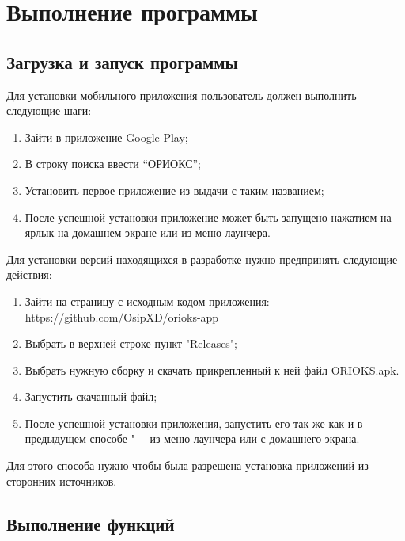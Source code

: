 \chapter{Выполнение программы}
\label{ch:execution}

\section{Загрузка и запуск программы}
\label{sec:running}
Для установки мобильного приложения пользователь должен выполнить следующие шаги:
\begin{enumerate}
  \item Зайти в приложение Google Play;
  \item В строку поиска ввести ``ОРИОКС'';
  \item Установить первое приложение из выдачи с таким названием;
  \item После успешной установки приложение может быть запущено нажатием на ярлык на домашнем экране или из меню лаунчера.
\end{enumerate}

Для установки версий находящихся в разработке нужно предпринять следующие действия:
\begin{enumerate}
  \item Зайти на страницу с исходным кодом приложения: https://github.com/OsipXD/orioks-app
  \item Выбрать в верхней строке пункт "Releases";
  \item Выбрать нужную сборку и скачать прикрепленный к ней файл ORIOKS.apk.
  \item Запустить скачанный файл;
  \item После успешной установки приложения, запустить его так же как и в предыдущем способе "--- из меню лаунчера или с домашнего экрана.
\end{enumerate}
Для этого способа нужно чтобы была разрешена установка приложений из сторонних источников.

\section{Выполнение функций}
\label{sec:кexecFunctions}
